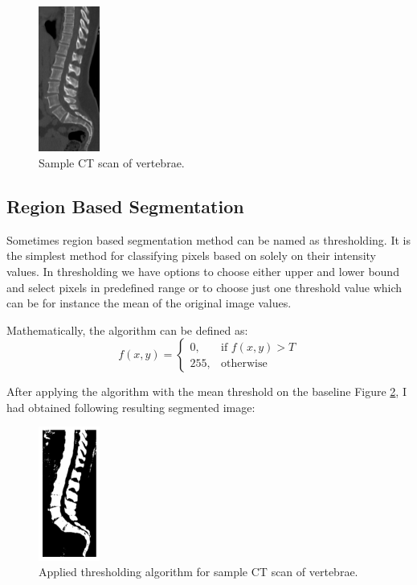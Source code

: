 \begin{figure}[h]
    \centering
    \includegraphics[width=2cm]{images/sample_vertebrae.jpeg}
    \caption{Sample CT scan of vertebrae.}
    \label{fig:sample_vertebrae}
\end{figure}


\subsection{Region Based Segmentation}
Sometimes region based segmentation method can be named as thresholding. It is the simplest method for classifying pixels based on solely on their intensity values. In thresholding we have options to choose either upper and lower bound and select pixels in predefined range or to choose just one threshold value which can be for instance the mean of the original image values. 

Mathematically, the algorithm can be defined as:
\[
    f(x, y)= 
\begin{cases}
    0   ,& \text{if } f(x, y) > T \\
    255 ,& \text{otherwise}
\end{cases}
\]

After applying the algorithm with the mean threshold on the baseline Figure \ref{fig:sample_vertebrae}, I had obtained following resulting segmented image:

\begin{figure}[h]
    \centering
    \includegraphics[width=2cm]{images/sample_vertebrae_thresholding.png}
    \caption{Applied thresholding algorithm for sample CT scan of vertebrae.}
    \label{fig:sample_vertebrae}
\end{figure}

